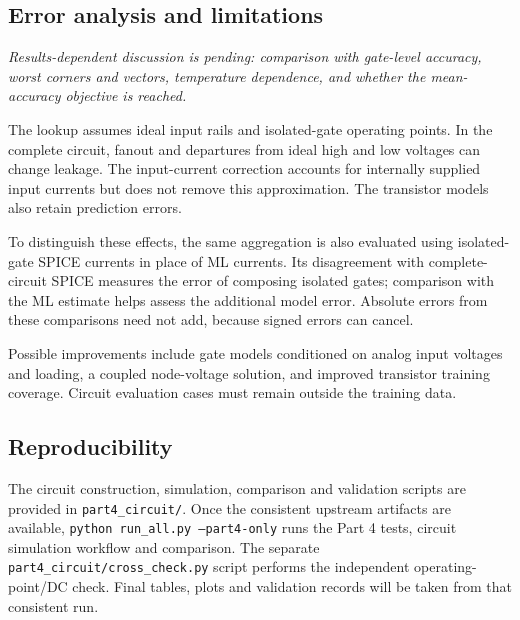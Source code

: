 \documentclass{article}
\begin{document}
\subsection{Error analysis and limitations}
\noindent\textit{Results-dependent discussion is pending: comparison with
gate-level accuracy, worst corners and vectors, temperature dependence,
and whether the mean-accuracy objective is reached.}

The lookup assumes ideal input rails and isolated-gate operating points.
In the complete circuit, fanout and departures from ideal high and low
voltages can change leakage. The input-current correction accounts for
internally supplied input currents but does not remove this approximation.
The transistor models also retain prediction errors.

To distinguish these effects, the same aggregation is also evaluated using
isolated-gate SPICE currents in place of ML currents. Its disagreement with
complete-circuit SPICE measures the error of composing isolated gates;
comparison with the ML estimate helps assess the additional model error.
Absolute errors from these comparisons need not add, because signed errors
can cancel.

Possible improvements include gate models conditioned on analog input
voltages and loading, a coupled node-voltage solution, and improved
transistor training coverage. Circuit evaluation cases must remain outside
the training data.

\subsection{Reproducibility}
The circuit construction, simulation, comparison and validation scripts
are provided in \texttt{part4\_circuit/}. Once the consistent upstream
artifacts are available, \texttt{python run\_all.py --part4-only} runs the
Part 4 tests, circuit simulation workflow and comparison. The separate
\texttt{part4\_circuit/cross\_check.py} script performs the independent
operating-point/DC check. Final tables, plots and validation records will
be taken from that consistent run.
\end{document}
